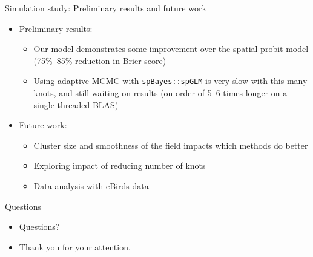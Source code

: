 \documentclass{beamer}
\begin{document}
\begin{frame}{Simulation study: Preliminary results and future work}
  \begin{itemize} \setlength{\itemsep}{1em}
    \item Preliminary results:
    \begin{itemize} \setlength{\itemsep}{0.5em}
      \item Our model demonstrates some improvement over the spatial probit model (75\%--85\% reduction in Brier score)
      \item Using adaptive MCMC with {\tt spBayes::spGLM} is very slow with this many knots, and still waiting on results (on order of 5--6 times longer on a single-threaded BLAS)
    \end{itemize}
    \item Future work:
    \begin{itemize} \setlength{\itemsep}{0.5em}
      \item Cluster size and smoothness of the field impacts which methods do better
      \item Exploring impact of reducing number of knots
      \item Data analysis with eBirds data
    \end{itemize}
  \end{itemize}
\end{frame}

\begin{frame}{Questions}
  \begin{itemize} \setlength{\itemsep}{1em}
    \item Questions?
    \item Thank you for your attention.
  \end{itemize}
\end{frame}
\end{document}
